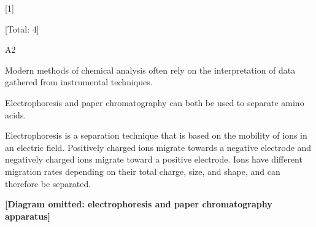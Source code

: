 \documentclass[11pt]{exam}
\makeatletter
\renewcommand{\dotfill}{%
  \leavevmode\cleaders\hb@xt@ 3pt{\hss.\hss}\hfill\kern\z@
}
\makeatother
\begin{document}
\begin{questions}
\begin{parts}
\vspace{4cm}

\hfill [1]

\end{parts}

\vfill
\hfill [Total: 4]

\newpage

\question A2

Modern methods of chemical analysis often rely on the interpretation of data gathered from instrumental techniques.

Electrophoresis and paper chromatography can both be used to separate amino acids.

Electrophoresis is a separation technique that is based on the mobility of ions in an electric field. Positively charged ions migrate towards a negative electrode and negatively charged ions migrate toward a positive electrode. Ions have different migration rates depending on their total charge, size, and shape, and can therefore be separated.

\textbf{[Diagram omitted: electrophoresis and paper chromatography apparatus]}

\end{questions}
\end{document}

